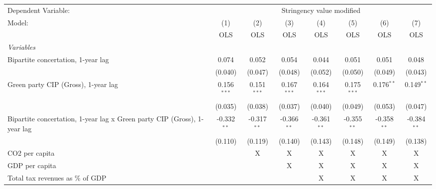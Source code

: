 
\begingroup
\centering
\begin{tabular}{lccccccc}
   \toprule
   Dependent Variable: & \multicolumn{7}{c}{Stringency value modified}\\
   Model:                                                                   & (1)           & (2)           & (3)           & (4)           & (5)           & (6)           & (7)\\  
                                                                            &  OLS          & OLS           & OLS           & OLS           & OLS           & OLS           & OLS\\  
   \midrule
   \emph{Variables}\\
   Bipartite concertation, 1-year lag                                       & 0.074         & 0.052         & 0.054         & 0.044         & 0.051         & 0.051         & 0.048\\   
                                                                            & (0.040)       & (0.047)       & (0.048)       & (0.052)       & (0.050)       & (0.049)       & (0.043)\\   
   Green party CIP (Gross), 1-year lag                                      & 0.156$^{***}$ & 0.151$^{***}$ & 0.167$^{***}$ & 0.164$^{***}$ & 0.175$^{***}$ & 0.176$^{**}$  & 0.149$^{**}$\\   
                                                                            & (0.035)       & (0.038)       & (0.037)       & (0.040)       & (0.049)       & (0.053)       & (0.047)\\   
   Bipartite concertation, 1-year lag x Green party CIP (Gross), 1-year lag & -0.332$^{**}$ & -0.317$^{**}$ & -0.366$^{**}$ & -0.361$^{**}$ & -0.355$^{**}$ & -0.358$^{**}$ & -0.384$^{**}$\\   
                                                                            & (0.110)       & (0.119)       & (0.140)       & (0.143)       & (0.148)       & (0.149)       & (0.138)\\   
   CO2 per capita                                                           &               & X             & X             & X             & X             & X             & X\\  
   GDP per capita                                                           &               &               & X             & X             & X             & X             & X\\  
   Total tax revenues as \% of GDP                                          &               &               &               & X             & X             & X             & X\\  

\end{tabular}
